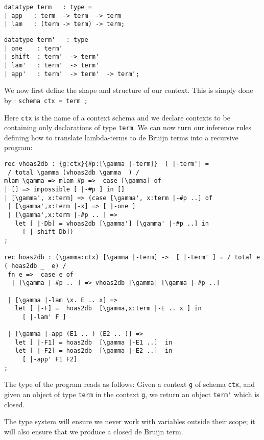 \begin{minipage}[t]{7cm}
\begin{lstlisting}
datatype term   : type =
| app   : term  -> term  -> term
| lam   : (term -> term) -> term;
  \end{lstlisting}
\end{minipage}
\begin{minipage}[t]{7cm}
\begin{lstlisting}
datatype term'   : type
| one    : term'
| shift  : term'  -> term'
| lam'   : term'  -> term'
| app'   : term'  -> term'  -> term';
\end{lstlisting}
\end{minipage}

We now first define the shape and structure of our context. This is
simply done by : \lstinline!schema ctx = term ; !


Here \lstinline!ctx! is the name of a context schema and we declare
contexts to be containing only declarations of type \lstinline!term!.
We can now turn our inference rules defining how to translate
lambda-terms to de Bruijn terms into a recursive program:


\begin{lstlisting}
rec vhoas2db : {g:ctx}{#p:[\gamma |-term]}  [ |-term'] =
 / total \gamma (vhoas2db \gamma  ) /
mlam \gamma => mlam #p =>  case [\gamma] of
| [] => impossible [ |-#p ] in []
| [\gamma', x:term] => (case [\gamma', x:term |-#p ..] of
 | [\gamma',x:term |-x] => [ |-one ]
 | [\gamma',x:term |-#p .. ] =>
   let [ |-Db] = vhoas2db [\gamma'] [\gamma' |-#p ..] in
     [ |-shift Db])
;

rec hoas2db : (\gamma:ctx) [\gamma |-term] ->  [ |-term' ] = / total e ( hoas2db _  e) /
 fn e =>  case e of
  | [\gamma |-#p .. ] => vhoas2db [\gamma] [\gamma |-#p ..]

 | [\gamma |-lam \x. E .. x] =>
   let [ |-F] =  hoas2db  [\gamma,x:term |-E .. x ] in
     [ |-lam' F ]

 | [\gamma |-app (E1 .. ) (E2 .. )] =>
   let [ |-F1] = hoas2db  [\gamma |-E1 ..]  in
   let [ |-F2] = hoas2db  [\gamma |-E2 ..]  in
     [ |-app' F1 F2]
;
\end{lstlisting}

The type of the program reads as follows: Given a context
\lstinline!g! of schema \lstinline!ctx!, and given an object of type
\lstinline!term! in the context \lstinline!g!, we return an object
\lstinline!term'! which is closed.

The type system will ensure we never work with variables outside their
scope; it will also ensure that we produce a closed de Bruijn term.

